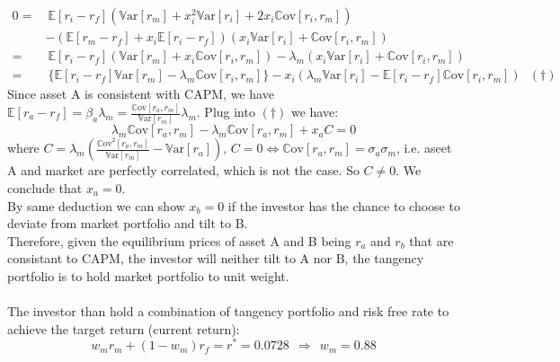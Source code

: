 \documentclass[10 pt]{hwtemplate} %
\begin{document}
\begin{equation}
  \begin{split}
    0 =&~\mathbb{E}\left[r_i - r_f\right]\left(\mathrm{\mathbb{V}ar}\left[r_m\right] + x_i^2\mathrm{\mathbb{V}ar}\left[r_i\right] + 2x_i \mathrm{\mathbb{C}ov}\left[r_i, r_m\right]\right)\\
    &-\left(\mathbb{E}\left[r_m - r_f\right]+x_i\mathbb{E}\left[r_i - r_f\right]\right)(x_i \mathrm{\mathbb{V}ar}\left[r_i\right]+\mathrm{\mathbb{C}ov}\left[r_i, r_m\right])\\
    =&~\mathbb{E}\left[r_i - r_f\right]\left(\mathrm{\mathbb{V}ar}\left[r_m\right]+x_i \mathrm{\mathbb{C}ov}\left[r_i, r_m\right]\right) -\lambda_m\left(x_i \mathrm{\mathbb{V}ar}\left[r_i\right]+\mathrm{\mathbb{C}ov}\left[r_i, r_m\right]\right)\\
    =&~\{\mathbb{E}\left[r_i - r_f\right]\mathrm{\mathbb{V}ar}\left[r_m\right] - \lambda_m \mathrm{\mathbb{C}ov}\left[r_i, r_m\right]\}-x_i(\lambda_m \mathrm{\mathbb{V}ar}\left[r_i\right]-\mathbb{E}\left[r_i - r_f\right] \mathrm{\mathbb{C}ov}\left[r_i, r_m\right])~~~(\dag)
  \end{split}
\end{equation}
Since asset A is consistent with CAPM, we have $\mathbb{E}\left[r_a - r_f\right] = \beta_a \lambda_m = \frac{\mathrm{\mathbb{C}ov}\left[r_a, r_m\right]}{\mathrm{\mathbb{V}ar}\left[r_m\right]} \lambda_m$. Plug into $(\dag)$ we have:
$$
\lambda_m \mathrm{\mathbb{C}ov}\left[r_a, r_m\right] - \lambda_m \mathrm{\mathbb{C}ov}\left[r_a, r_m\right] + x_a C = 0
$$
where $C = \lambda_m \left(\frac{\mathrm{\mathbb{C}ov}^2\left[r_a, r_m\right]}{\mathrm{\mathbb{V}ar}\left[r_m\right]}-\mathrm{\mathbb{V}ar}\left[r_a\right]\right)$, $C=0 \iff \mathrm{\mathbb{C}ov}\left[r_a, r_m\right]=\sigma_a \sigma_m$, i.e. aseet A and market are perfectly correlated, which is not the case. So $C\ne 0$. We conclude that $x_a = 0$.\\
By same deduction we can show $x_b=0$ if the investor has the chance to choose to deviate from market portfolio and tilt to B.\\
Therefore, given the equilibrium prices of asset A and B being $r_a$ and $r_b$ that are consistant to CAPM, the investor will neither tilt to A nor B, the tangency portfolio is to hold market portfolio to unit weight.\\
~\\
The investor than hold a combination of tangency portfolio and risk free rate to achieve the target return (current return):
\begin{equation}
  w_m r_m + (1-w_m) r_f = r^* = 0.0728 ~~\Rightarrow~~ w_m = 0.88
\end{equation}
\end{document}
